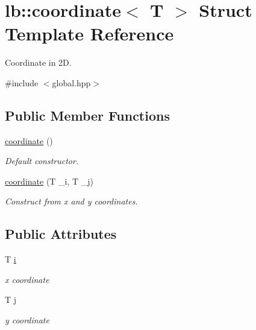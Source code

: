\hypertarget{structlb_1_1coordinate}{\section{lb\-:\-:coordinate$<$ \-T $>$ \-Struct \-Template \-Reference}
\label{structlb_1_1coordinate}
}


\-Coordinate in 2\-D.  




{\ttfamily \#include $<$global.\-hpp$>$}

\subsection*{\-Public \-Member \-Functions}
\begin{DoxyCompactItemize}
\item 
\hypertarget{structlb_1_1coordinate_ab61c59eb496e43833e0454e108df9c4f}{\hyperlink{structlb_1_1coordinate_ab61c59eb496e43833e0454e108df9c4f}{coordinate} ()}\label{structlb_1_1coordinate_ab61c59eb496e43833e0454e108df9c4f}

\begin{DoxyCompactList}\small\item\em \-Default constructor. \end{DoxyCompactList}\item 
\hyperlink{structlb_1_1coordinate_aa40fddac8d22a73745e9da4b884f54d9}{coordinate} (\-T \-\_\-i, \-T \-\_\-j)
\begin{DoxyCompactList}\small\item\em \-Construct from x and y coordinates. \end{DoxyCompactList}\end{DoxyCompactItemize}
\subsection*{\-Public \-Attributes}
\begin{DoxyCompactItemize}
\item 
\hypertarget{structlb_1_1coordinate_ab4a8bf14cc492e16a129f62f8179d3ad}{\-T \hyperlink{structlb_1_1coordinate_ab4a8bf14cc492e16a129f62f8179d3ad}{i}}\label{structlb_1_1coordinate_ab4a8bf14cc492e16a129f62f8179d3ad}

\begin{DoxyCompactList}\small\item\em x coordinate \end{DoxyCompactList}\item 
\hypertarget{structlb_1_1coordinate_ac6c9274d7cdf872e5ce6c131ff0ec145}{\-T \hyperlink{structlb_1_1coordinate_ac6c9274d7cdf872e5ce6c131ff0ec145}{j}}\label{structlb_1_1coordinate_ac6c9274d7cdf872e5ce6c131ff0ec145}

\begin{DoxyCompactList}\small\item\em y coordinate \end{DoxyCompactList}\end{DoxyCompactItemize}

